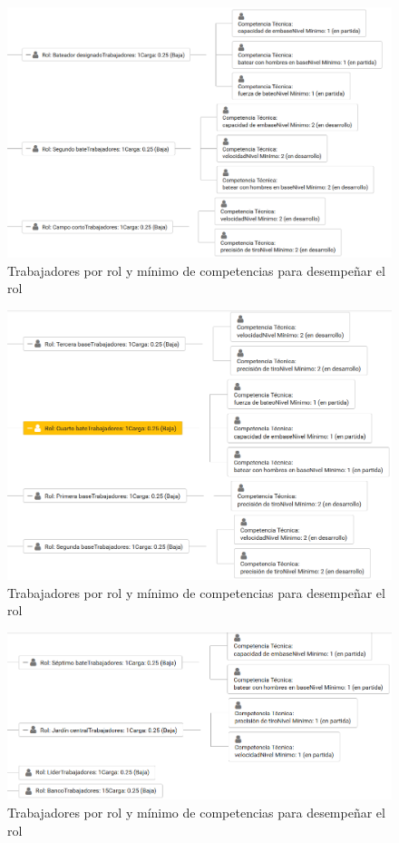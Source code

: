 {\begin{figure}[H]
	\centering
	\includegraphics[width=\textwidth]{figuras/beisbol_conf_problema2.png}
	\caption{Trabajadores por rol y mínimo de competencias para desempeñar el rol} \label{fig:conf-equipo-pelota2}
\end{figure}

\begin{figure}[H]
	\centering
	\includegraphics[width=.9\textwidth]{figuras/beisbol_conf_problema3.png}
	\caption{Trabajadores por rol y mínimo de competencias para desempeñar el rol} \label{fig:conf-equipo-pelota3}
\end{figure}

\begin{figure}[H]
	\centering
	\includegraphics[width=.9\textwidth]{figuras/beisbol_conf_problema4.png}
	\caption{Trabajadores por rol y mínimo de competencias para desempeñar el rol} \label{fig:conf-equipo-pelota4}
\end{figure}

}
